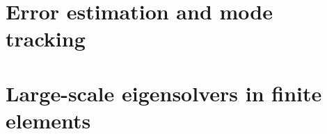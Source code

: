
\section{Error estimation and mode tracking}
\label{sec:eigenproblems:error}


\section{Large-scale eigensolvers in finite elements}
\label{sec:eigenproblems:solvers}

